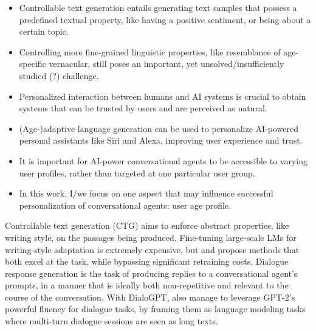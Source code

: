 
\begin{itemize}
    \item Controllable text generation entails generating text samples that possess a predefined textual property, like having a positive sentiment, or being about a certain topic.
    \item Controlling more fine-grained linguistic properties, like resemblance of age-specific vernacular, still poses an important, yet unsolved/insufficiently studied (?) challenge.
    \item Personalized interaction between humans and AI systems is crucial to obtain systems that can be trusted by users and are perceived as natural.
    \item (Age-)adaptive language generation can be used to personalize AI-powered personal assistants like Siri and Alexa, improving user experience and trust.
    \item It is important for AI-power conversational agents to be accessible to varying user profiles, rather than targeted at one particular user group. 
    \item In this work, I/we focus on one aspect that may influence successful personalization of conversational agents: user age profile.
\end{itemize}

Controllable text generation (CTG) aims to enforce abstract properties, like writing style, on the passages being produced. Fine-tuning large-scale LMs for writing-style adaptation is extremely expensive, but \cite{dathathri2019plug} and \cite{li-etal-2020-optimus} propose methods that both excel at the task, while bypassing significant retraining costs. Dialogue response generation is the task of producing replies to a conversational agent's prompts, in a manner that is ideally both non-repetitive and relevant to the course of the conversation. With DialoGPT, \cite{zhang2019dialogpt} also manage to leverage GPT-2's powerful fluency for dialogue tasks, by framing them as language modeling tasks where multi-turn dialogue sessions are seen as long texts.


